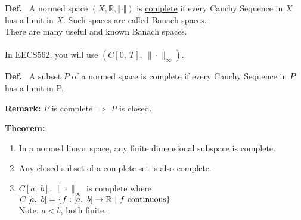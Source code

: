 \documentclass[letterpaper]{article}
\newcommand{\real}{\mathbb R}  %
\begin{document}
\noindent \textbf{Def.}~ A normed space $(X,\real,\Vert\cdot\Vert)$ is \underline{complete} if every Cauchy Sequence in $X$ has a limit in $X$. Such spaces are called \underline{Banach spaces}.\\
    There are many useful and known Banach spaces.\\ \\
    In EECS562, you will use $\left(C\left[0,\ T\right],\ \|\cdot\|_\infty\right)$.

\noindent \textbf{Def.}~ A subset $P$ of a normed space is \underline{complete} if every Cauchy Sequence in $P$ has a limit in P.

\noindent \textbf{Remark:} $P$ is complete $\Rightarrow$ $P$ is closed.

\noindent \textbf{Theorem:}
    \begin{enumerate}
        \item In a normed linear space, any finite dimensional subspace is complete.
        \item Any closed subset of a complete set is also complete.
        \item $C\left[a,\ b\right]$, $\|\cdot\|_\infty$ is complete where $C\left[a,\ b\right]=\left\{f:\left[a,\ b\right]\rightarrow\real\ |\ f\textnormal{ continuous}\right\}$\\
        Note: $a<b$, both finite.
    \end{enumerate}
\end{document}
